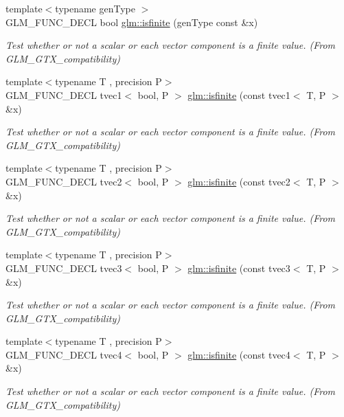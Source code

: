 \begin{DoxyCompactItemize}
{\footnotesize template$<$typename gen\+Type $>$ }\\G\+L\+M\+\_\+\+F\+U\+N\+C\+\_\+\+D\+E\+C\+L bool \hyperlink{group__gtx__compatibility_gaf4b04dcd3526996d68c1bfe17bfc8657}{glm\+::isfinite} (gen\+Type const \&x)
\begin{DoxyCompactList}\small\item\em Test whether or not a scalar or each vector component is a finite value. (From G\+L\+M\+\_\+\+G\+T\+X\+\_\+compatibility) \end{DoxyCompactList}\item 
{\footnotesize template$<$typename T , precision P$>$ }\\G\+L\+M\+\_\+\+F\+U\+N\+C\+\_\+\+D\+E\+C\+L tvec1$<$ bool, P $>$ \hyperlink{group__gtx__compatibility_ga553e2e95b06a0f70c718605998889d3b}{glm\+::isfinite} (const tvec1$<$ T, P $>$ \&x)
\begin{DoxyCompactList}\small\item\em Test whether or not a scalar or each vector component is a finite value. (From G\+L\+M\+\_\+\+G\+T\+X\+\_\+compatibility) \end{DoxyCompactList}\item 
{\footnotesize template$<$typename T , precision P$>$ }\\G\+L\+M\+\_\+\+F\+U\+N\+C\+\_\+\+D\+E\+C\+L tvec2$<$ bool, P $>$ \hyperlink{group__gtx__compatibility_ga7dd492aa7d6ec21715f9a91b6e5e596a}{glm\+::isfinite} (const tvec2$<$ T, P $>$ \&x)
\begin{DoxyCompactList}\small\item\em Test whether or not a scalar or each vector component is a finite value. (From G\+L\+M\+\_\+\+G\+T\+X\+\_\+compatibility) \end{DoxyCompactList}\item 
{\footnotesize template$<$typename T , precision P$>$ }\\G\+L\+M\+\_\+\+F\+U\+N\+C\+\_\+\+D\+E\+C\+L tvec3$<$ bool, P $>$ \hyperlink{group__gtx__compatibility_ga1be9593d810fceb278a2854da8a25273}{glm\+::isfinite} (const tvec3$<$ T, P $>$ \&x)
\begin{DoxyCompactList}\small\item\em Test whether or not a scalar or each vector component is a finite value. (From G\+L\+M\+\_\+\+G\+T\+X\+\_\+compatibility) \end{DoxyCompactList}\item 
{\footnotesize template$<$typename T , precision P$>$ }\\G\+L\+M\+\_\+\+F\+U\+N\+C\+\_\+\+D\+E\+C\+L tvec4$<$ bool, P $>$ \hyperlink{group__gtx__compatibility_ga8c6a59e2f2ac84fba0c5932f1c35bf7a}{glm\+::isfinite} (const tvec4$<$ T, P $>$ \&x)
\begin{DoxyCompactList}\small\item\em Test whether or not a scalar or each vector component is a finite value. (From G\+L\+M\+\_\+\+G\+T\+X\+\_\+compatibility) \end{DoxyCompactList}\end{DoxyCompactItemize}


